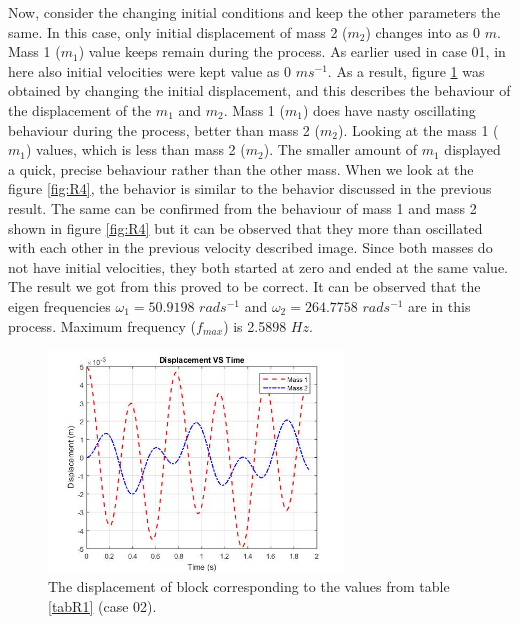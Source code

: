 Now, consider the changing initial conditions and keep the other parameters the same. In this case, only initial displacement of mass 2 ($m_2$) changes into as 0 $m$. Mass 1 ($m_1$) value keeps remain during the process. As earlier used in case 01, in here also initial velocities were kept value as 0 $ms^{-1}$. As a result, figure \ref{fig:R3} was obtained by changing the initial displacement, and this describes the behaviour of the displacement of the $m_1$ and $m_2$. Mass 1 ($m_1$) does have nasty oscillating behaviour during the process, better than mass 2 ($m_2$). Looking at the mass 1 ($m_1$) values, which is less than mass 2 ($m_2$). The smaller amount of $m_1$ displayed a quick, precise behaviour rather than the other mass. When we look at the figure \ref{fig:R4}, the behavior is similar to the behavior discussed in the previous result. The same can be confirmed from the behaviour of mass 1  and mass 2  shown in figure \ref{fig:R4} but it can be observed that they more than oscillated with each other in the previous  velocity described image. Since both masses do not have initial velocities, they both started at zero and ended at the same value. The result we got from this proved to be correct. It can be observed that the eigen frequencies $\omega_1 = 50.9198$ $rads^{-1}$ and $\omega_2 = 264.7758$ $rads^{-1}$ are in this process. Maximum frequency ($f_{max}$) is 2.5898 $Hz$. 



 \begin{figure}[hbt!]
	\centering
	\begin{framed}
	\includegraphics[width=0.7\textwidth]{Figures/R2D.jpg}
	\end{framed}
	\caption{ The displacement of block corresponding to the values from table \ref{tabR1} (case 02). }
	\label{fig:R3}
\end{figure}

